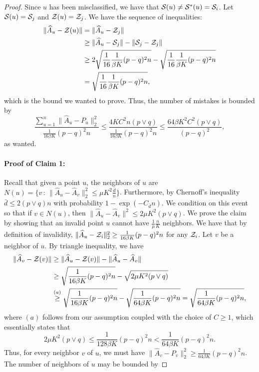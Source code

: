 \documentclass{article}
\begin{document}
\begin{proof}
Since $u$ has been misclassified, we have that ${\cal S}(u) \neq {\cal S}^*(u) = {\cal S}_i$. Let ${\cal S}(u) = {\cal S}_j$ and ${\cal Z}(u) = {\cal Z}_j$. We have the sequence of inequalities:
\begin{align*}
\|\hat A_u - {\cal Z}(u)\| &= \| \hat A_u - {\cal Z}_j \|\\
&\geq \| \hat A_u - {\cal S}_j \| - \| {\cal S}_j - {\cal Z}_j \|\\
&\geq 2\sqrt{\frac{1}{16}\frac{1}{\beta K} (p-q)^2 n} - \sqrt{\frac{1}{16}\frac{1}{\beta K} (p-q)^2 n}\\
&= \sqrt{\frac{1}{16}\frac{1}{\beta K} (p-q)^2 n},
\end{align*}
which is the bound we wanted to prove. Thus, the number of mistakes is bounded by
\[
\frac{\sum_{u=1}^n \| \hat{A}_u - P_u \|_2^2}{ \frac{1}{16 \beta K} (p-q)^2 n } \leq 
        \frac{ 4 K C^2 n (p \vee q)}{ \frac{1}{16 \beta K} (p-q)^2 n} \leq \frac{64 \beta K^2 C^2 (p \vee q)}{(p-q)^2},
\]
as wanted.

\paragraph{\textbf{Proof of Claim 1:}} Recall that given a point $u$, the neighbors of $u$ are $N(u) = \{ v \,:\, \| \hat{A}_u - \hat{A}_v \|_2^2 \leq \mu K^2 \frac{\bar{d}}{n} \}$. Furthermore, by Chernoff's inequality $\bar{d} \leq 2 (p \vee q) n$ with probability $1 - \exp(-C_{\bar d}n)$. 
We condition on this event so that if $v \in N(u)$, then $\| \hat{A}_u - \hat{A}_v \|^2 \leq 2 \mu K^2 (p \vee q)$. We prove the claim by showing that an invalid point $u$ cannot have $\frac{1}{\mu} \frac{n}{K}$ neighbors. We have that by definition of invalidity, $ \| \hat{A}_u - {\cal Z}_i \|_2^2 \geq \frac{1}{16 \beta K} (p-q)^2 n$ for any ${\cal Z}_i$. Let $v$ be a neighbor of $u$. By triangle inequality, we have
\begin{align*}
\| \hat A_v - {\cal Z}(v) \| &\geq  \|\hat A_u - {\cal Z}(v) \| -  \|\hat A_u - \hat A_v \| \\
&\geq \sqrt{\frac{1}{16 \beta K} (p-q)^2 n} - \sqrt{2 \mu K^2 (p \vee q)}\\
&\stackrel{(a)}\geq  \sqrt{\frac{1}{16 \beta K} (p-q)^2 n} - \sqrt{\frac{1}{64 \beta K} (p-q)^2 n} = \sqrt{\frac{1}{64 \beta K} (p-q)^2 n},
\end{align*}
where $(a)$ follows from our assumption coupled with the choice of $C \geq 1$, which essentially states that
$$2 \mu K^2 (p \vee q) \leq \frac{1}{128 \beta K} (p-q)^2 n < \frac{1}{64 \beta K} (p-q)^2 n.$$
Thus, for every neighbor $v$ of $u$, we must have $\| \hat{A}_v - P_v \|_2^2 \geq \frac{1}{64 \beta K} (p-q)^2 n$. The number of neighbors of $u$ may be bounded by 


\end{proof}
\end{document}
